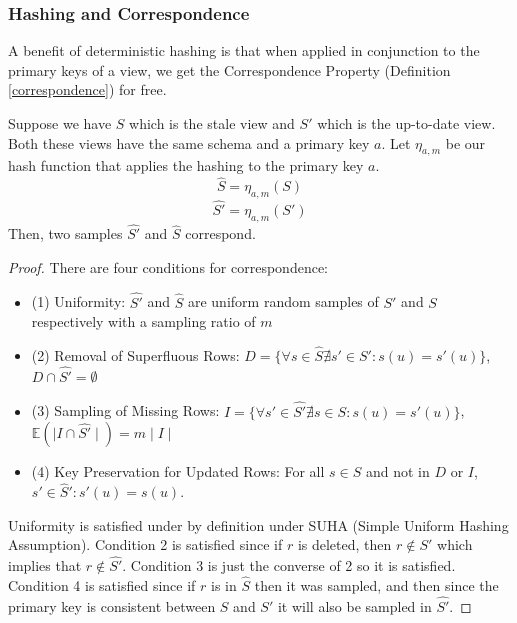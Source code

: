 \subsubsection{Hashing and Correspondence}
A benefit of deterministic hashing is that when applied in conjunction to the primary keys of a view, we get the Correspondence Property (Definition \ref{correspondence}) for free.
\begin{proposition}
Suppose we have $S$ which is the stale view and $S'$ which is the up-to-date view.
Both these views have the same schema and a primary key $a$.
Let $\eta_{a, m}$ be our hash function that applies the hashing to the primary key $a$.
\[
\hat{S} = \eta_{a, m}(S)
\]
\[
\hat{S'} = \eta_{a, m}(S')
\]
Then, two samples $\hat{S'}$ and $\hat{S}$ correspond.
\end{proposition}
\begin{proof}
There are four conditions for correspondence:
\begin{itemize}
\item (1) Uniformity: $\widehat{S'}$ and $\widehat{S}$ are uniform random samples of $S'$ and $S$ respectively with a sampling ratio of $m$
\item (2) Removal of Superfluous Rows: $D = \{\forall s \in \widehat{S} \nexists s' \in S': s(u) = s'(u)\}$, $D \cap \widehat{S'} = \emptyset$ 
\item (3) Sampling of Missing Rows: $I = \{\forall s' \in \widehat{S'} \nexists s \in S: s(u) = s'(u)\}$, $\mathbb{E}(\mid I \cap \widehat{S'} \mid) = m\mid I \mid $ 
\item (4) Key Preservation for Updated Rows: For all $s\in \widehat{S}$ and not in $D$ or $I$, $s' \in \widehat{S}': s'(u) = s(u)$.
\end{itemize}
Uniformity is satisfied under by definition under SUHA (Simple Uniform Hashing Assumption).
Condition 2 is satisfied since if $r$ is deleted, then $r \not \in S'$ which implies that $r \not\in \hat{S'}$.
Condition 3 is just the converse of 2 so it is satisfied.
Condition 4 is satisfied since if $r$ is in $\hat{S}$ then it was sampled, and then since the primary key is consistent between $S$ and $S'$ it will also be sampled in $\hat{S'}$.
\end{proof}

